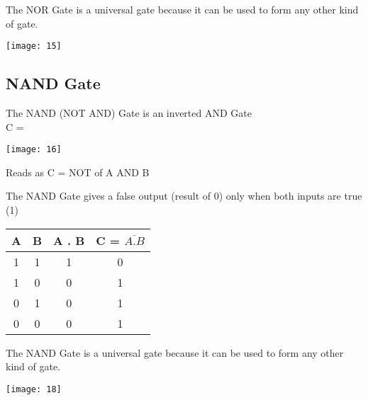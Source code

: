 \documentclass{article}
\begin{document}
\color{red}The NOR Gate is a universal gate because it can be used to form any other kind of gate. \\ \color{black}
\begin{center}
	\texttt{[image: 15]}
\end{center}

\subsection{NAND Gate}
The NAND (NOT AND) Gate is an inverted AND Gate \\
C = \begin{center}
	\texttt{[image: 16]}
\end{center}
\color{red}Reads as C = NOT of A AND B \\ \color{black}

The NAND Gate gives a false output (result of 0) only when both inputs are true (1) \\

\begin{table}[h!]
	\begin{center}
		\begin{tabular}{c|c|c|c}
			\textbf{A} & \textbf{B} &
			\textbf{A . B} & \textbf{C = $\overline{A . B}$}\\
			\hline
			1 & 1 & 1 & 0\\
			\hline
			1 & 0 & 0 & 1\\
			\hline
			0 & 1 & 0 & 1\\
			\hline
			0 & 0 & 0 & 1\\
			\hline
		\end{tabular}
	\end{center}
\end{table} 

\color{red}The NAND Gate is a universal gate because it can be used to form any other kind of gate. \\ \color{black}
\begin{center}
	\texttt{[image: 18]}
\end{center}
\end{document}
